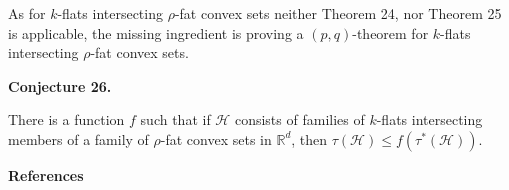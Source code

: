 \documentclass[10pt,a4paper]{amsart}
\begin{document}
\par
\par
As for $k$-flats intersecting $\rho$-fat convex sets neither Theorem 24, nor Theorem 25 is applicable, the missing ingredient is proving a $(p,q)$-theorem for $k$-flats intersecting $\rho$-fat convex sets.
\par
\par
\par\medskip\noindent\textbf{Conjecture 26.}\par
There is a function $f$ such that if $\mathcal{H}$ consists of families of $k$-flats intersecting members of a family of $\rho$-fat convex sets in $\mathbb{R}^{d}$, then $\tau(\mathcal{H})\leq f(\tau^{*}(\mathcal{H}))$.
\par
\par
\par
\par\medskip\noindent\textbf{References}\par
\end{document}
